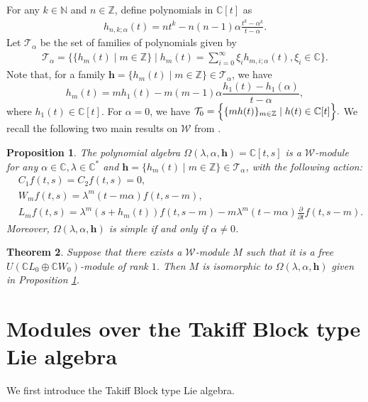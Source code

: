 \documentclass[a4paper]{amsart}
\numberwithin{equation}{section}
\newtheorem{theorem}{Theorem}[section]
\newtheorem{proposition}[theorem]{Proposition}
\begin{document}
     For any $k\in\mathbb{N}$ and $n\in\mathbb{Z}$, define polynomials in $\mathbb{C}[t]$ as
     \begin{align*}h_{n,k;\alpha}(t)=nt^{k}-n(n-1)\alpha\frac{t^{k}-\alpha^{k}}{t-\alpha}.\end{align*}
 Let $\mathcal{T}_{\alpha}$ be the set of families of polynomials given by
 \begin{align*} 
     \mathcal{T}_{\alpha}=\Big\{\{h_{m}(t)\mid m\in\mathbb{Z}\}\mid h_{m}(t)=\sum_{i=0}^{\infty}\xi_{i}h_{m,i;\alpha}(t),\xi_{i}\in\mathbb{C}\Big\}.
 \end{align*}
Note that, for a family $\mathbf h=\{h_m(t)\mid m\in\mathbb Z\}\in \mathcal{T}_{\alpha}$, we have
\begin{equation}\label{eq:hm-h1-relation}
h_m(t)=mh_1(t)-m(m-1)\alpha\frac{h_1(t)-h_1(\alpha)}{t-\alpha},
\end{equation}
where $h_1(t)\in\mathbb{C}[t]$.
	 For $\alpha=0$, we have
	 $
	 \mathcal{T}_{0}=\Bigl\{\{mh(t)\}_{m\in\mathbb Z}\mid h(t)\in\mathbb C[t]\Bigr\}.
 $
 We recall the following two main results on $\mathcal{W}$ from \cite{CG17}.
 \begin{proposition}\label{pro2.2}
     The polynomial algebra $\Omega(\lambda,\alpha,\mathbf{h})=\mathbb{C}[t,s]$ is a $\mathcal{W}$-module for any $\alpha\in\mathbb{C},\lambda\in\mathbb{C}^{*}$ and $\mathbf{h}=\{h_{m}(t)\mid m\in\mathbb{Z}\}\in\mathcal{T}_{\alpha}$, with the following action:
     \begin{align*}
         &C_{1}f(t,s)=C_{2}f(t,s)=0,\\
       &  W_{m}f(t,s)=\lambda^{m}(t-m\alpha)f(t,s-m),\\
      &   L_{m}f(t,s)=\lambda^{m}(s+h_{m}(t))f(t,s-m)-m\lambda^{m}(t-m\alpha)\frac{\partial}{\partial t}f(t,s-m).
     \end{align*}
      Moreover, $\Omega(\lambda,\alpha,\mathbf{h})$ is simple if and only if $\alpha\neq0$.
 

 \end{proposition}
 \begin{theorem}\label{th2.3}
 Suppose that there exists a  $\mathcal{W}$-module $M$  such that it is a free 
$U(\mathbb{C}L_{0}\oplus\mathbb{C}W_{0})$-module of rank $1$.
 Then $M$ is isomorphic to $\Omega(\lambda,\alpha,\mathbf{h})$ given  in Proposition \ref{pro2.2}.
 \end{theorem}
 \section{Modules over
 the Takiff Block type Lie algebra}
 We first introduce the Takiff Block type Lie algebra.
\end{document}
